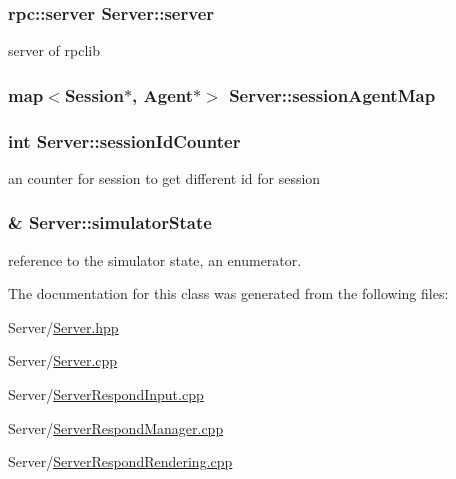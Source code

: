 \subsubsection[{\texorpdfstring{server}{server}}]{\setlength{\rightskip}{0pt plus 5cm}rpc\+::server Server\+::server\hspace{0.3cm}{\ttfamily [private]}}\hypertarget{classServer_a3f6f17fe0e321f0e4fc6bed80a5efc3d}{}\label{classServer_a3f6f17fe0e321f0e4fc6bed80a5efc3d}
server of rpclib 
\subsubsection[{\texorpdfstring{session\+Agent\+Map}{sessionAgentMap}}]{\setlength{\rightskip}{0pt plus 5cm}map$<${\bf Session}$\ast$, {\bf Agent}$\ast$$>$ Server\+::session\+Agent\+Map\hspace{0.3cm}{\ttfamily [private]}}\hypertarget{classServer_ad19c76785348bfd91a941aa78ef6a35c}{}\label{classServer_ad19c76785348bfd91a941aa78ef6a35c}
\subsubsection[{\texorpdfstring{session\+Id\+Counter}{sessionIdCounter}}]{\setlength{\rightskip}{0pt plus 5cm}int Server\+::session\+Id\+Counter\hspace{0.3cm}{\ttfamily [private]}}\hypertarget{classServer_abcdb8b5ca33795cdd8f252cf4c3e4f0f}{}\label{classServer_abcdb8b5ca33795cdd8f252cf4c3e4f0f}
an counter for session to get different id for session 
\subsubsection[{\texorpdfstring{simulator\+State}{simulatorState}}]{\& Server\+::simulator\+State\hspace{0.3cm}{\ttfamily [private]}}\hypertarget{classServer_a1e6a901e88f3a8b2d2fea253e32952e4}{}\label{classServer_a1e6a901e88f3a8b2d2fea253e32952e4}
reference to the simulator state, an enumerator. 

The documentation for this class was generated from the following files\+:\begin{DoxyCompactItemize}
\item 
Server/\hyperlink{Server_8hpp}{Server.\+hpp}\item 
Server/\hyperlink{Server_8cpp}{Server.\+cpp}\item 
Server/\hyperlink{ServerRespondInput_8cpp}{Server\+Respond\+Input.\+cpp}\item 
Server/\hyperlink{ServerRespondManager_8cpp}{Server\+Respond\+Manager.\+cpp}\item 
Server/\hyperlink{ServerRespondRendering_8cpp}{Server\+Respond\+Rendering.\+cpp}\end{DoxyCompactItemize}
